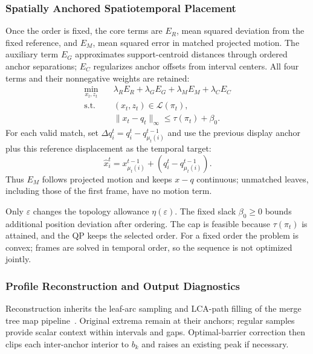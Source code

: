 \documentclass[review]{vgtc}
\begin{document}
\subsubsection{Spatially Anchored Spatiotemporal Placement}
Once the order is fixed, the core terms are $E_R$, mean squared deviation from the fixed reference, and $E_M$, mean squared error in matched projected motion. The auxiliary term $E_G$ approximates support-centroid distances through ordered anchor separations; $E_C$ regularizes anchor offsets from interval centers. All four terms and their nonnegative weights are retained:
\begin{equation}\label{eq:qp}
\begin{aligned}
 \min_{x_t,z_t}\quad&\lambda_R E_R+\lambda_G E_G+\lambda_M E_M+\lambda_C E_C\\
 \mathrm{s.t.}\quad&(x_t,z_t)\in\mathcal{L}(\pi_t),\\
 &\|x_t-q_t\|_\infty\le\tau(\pi_t)+\beta_0.
\end{aligned}
\end{equation}
For each valid match, set $\Delta q_i^t=q_i^t-q_{\mu_t(i)}^{t-1}$ and use the previous display anchor plus this reference displacement as the temporal target:
\begin{equation}\label{eq:temporal_target}
 \hat x_i^t=x_{\mu_t(i)}^{t-1}+(q_i^t-q_{\mu_t(i)}^{t-1}).
\end{equation}
Thus $E_M$ follows projected motion and keeps $x-q$ continuous; unmatched leaves, including those of the first frame, have no motion term.

Only $\varepsilon$ changes the topology allowance $\eta(\varepsilon)$. The fixed slack $\beta_0\ge0$ bounds additional position deviation after ordering. The cap is feasible because $\tau(\pi_t)$ is attained, and the QP keeps the selected order. For a fixed order the problem is convex; frames are solved in temporal order, so the sequence is not optimized jointly.

\subsubsection{Profile Reconstruction and Output Diagnostics}
Reconstruction inherits the leaf-arc sampling and LCA-path filling of the merge tree map pipeline~\cite{Koepp:2023:TMTM,STMTM:2026}. Original extrema remain at their anchors; regular samples provide scalar context within intervals and gaps. Optimal-barrier correction then clips each inter-anchor interior to $b_k$ and raises an existing peak if necessary.
\end{document}
